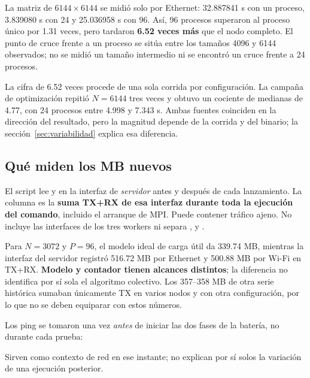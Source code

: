 La matriz de $6144\times6144$ se midió solo por Ethernet: 32.887841 s con un proceso, 3.839080 s con 24 y 25.036958 s con 96. Así, 96 procesos superaron al proceso único por 1.31 veces, pero tardaron \textbf{6.52 veces más} que el nodo completo. El punto de cruce frente a un proceso se sitúa entre los tamaños 4096 y 6144 observados; no se midió un tamaño intermedio ni se encontró un cruce frente a 24 procesos.

La cifra de 6.52 veces procede de una sola corrida por configuración. La campaña de optimización repitió $N=6144$ tres veces y obtuvo un cociente de medianas de 4.77, con 24 procesos entre 4.998 y 7.343 s. Ambas fuentes coinciden en la dirección del resultado, pero la magnitud depende de la corrida y del binario; la sección~\ref{sec:variabilidad} explica esa diferencia.


\subsection{Qué miden los MB nuevos}
El script  lee  y  en la interfaz de \emph{servidor} antes y después de cada lanzamiento. La columna  es la \textbf{suma TX+RX de esa interfaz durante toda la ejecución del comando}, incluido el arranque de MPI. Puede contener tráfico ajeno. No incluye las interfaces de los tres workers ni separa ,  y .



Para $N=3072$ y $P=96$, el modelo ideal de carga útil da 339.74 MB, mientras la interfaz del servidor registró 516.72 MB por Ethernet y 500.88 MB por Wi-Fi en TX+RX. \textbf{Modelo y contador tienen alcances distintos}; la diferencia no identifica por sí sola el algoritmo colectivo. Los 357--358 MB de otra serie histórica sumaban únicamente TX en varios nodos y con otra configuración, por lo que no se deben equiparar con estos números.

Los ping se tomaron una vez \emph{antes} de iniciar las dos fases de la batería, no durante cada prueba:

Sirven como contexto de red en ese instante; no explican por sí solos la variación de una ejecución posterior.

